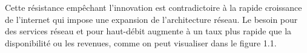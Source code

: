






Cette résistance empêchant l'innovation est contradictoire à la rapide croissance de l'internet qui impose une expansion de l'architecture réseau. 
Le besoin pour des services réseau et pour haut-débit augmente à un taux plus rapide que la disponibilité ou les revenues, comme on peut visualiser dans le figure 1.1.


